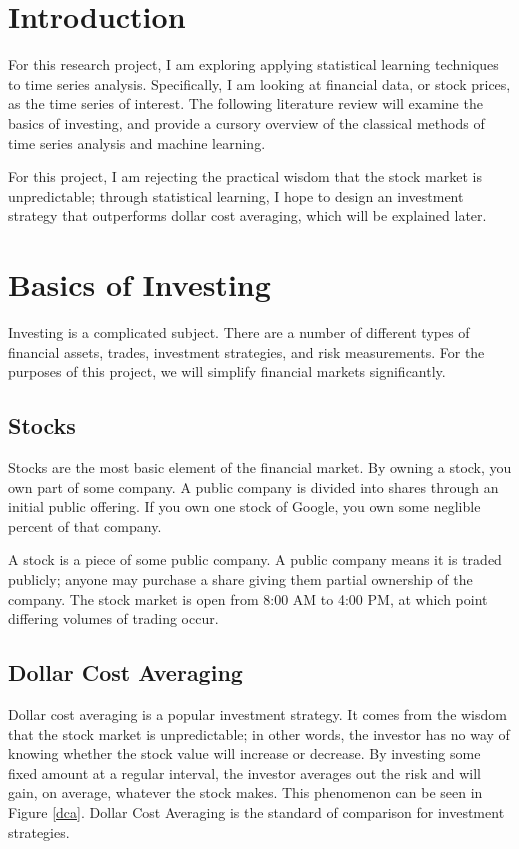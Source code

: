 \documentclass[12pt]{article}
\begin{document}
\tableofcontents
\newpage 
\section{Introduction}
For this research project, I am exploring applying statistical learning techniques to time series analysis. Specifically, I am looking at financial data, or stock prices, as the time series of interest. The following literature review will examine the basics of investing, and provide a cursory overview of the classical methods of time series analysis and machine learning.

For this project, I am rejecting the practical wisdom that the stock market is unpredictable; through statistical learning, I hope to design an investment strategy that outperforms dollar cost averaging, which will be explained later.

\section{Basics of Investing}
Investing is a complicated subject. There are a number of different types of financial assets, trades, investment strategies, and risk measurements. For the purposes of this project, we will simplify financial markets significantly. 

\subsection{Stocks}
Stocks are the most basic element of the financial market. By owning a stock, you own part of some company. A public company is divided into shares through an initial public offering. If you own one stock of Google, you own some neglible percent of that company.

A stock is a piece of some public company. A public company means it is traded publicly; anyone may purchase a share giving them partial ownership of the company. The stock market is open from 8:00 AM to 4:00 PM, at which point differing volumes of trading occur. 

\subsection{Dollar Cost Averaging}
Dollar cost averaging is a popular investment strategy. It comes from the wisdom that the stock market is unpredictable; in other words, the investor has no way of knowing whether the stock value will increase or decrease. By investing some fixed amount at a regular interval, the investor averages out the risk and will gain, on average, whatever the stock makes. This phenomenon can be seen in Figure \ref{dca}. Dollar Cost Averaging is the standard of comparison for investment strategies. 
\end{document}
